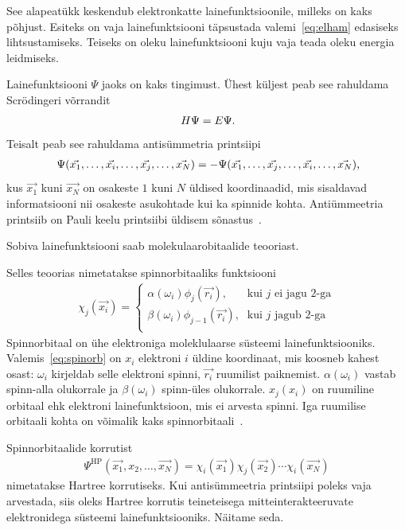 \documentclass[12pt]{report}
\begin{document}
See alapeatükk keskendub elektronkatte lainefunktsioonile, milleks on kaks põhjust.
Esiteks on vaja lainefunktsiooni täpsustada valemi~\eqref{eq:elham} edasiseks lihtsustamiseks.
Teiseks on oleku lainefunktsiooni kuju vaja teada oleku energia leidmiseks.

Lainefunktsiooni \(\Psi\) jaoks on kaks tingimust.
Ühest küljest peab see rahuldama Scrödingeri võrrandit
\begin{align}
    H \Psi = E \Psi \rlap{.}
\end{align}
Teisalt peab see rahuldama antisümmetria printsiipi
\begin{align}
    \Psi(\vec{x_1}, \ldots, \vec{x_i}, \ldots, \vec{x_j}, \ldots, \vec{x_N})
    = -\Psi(\vec{x_1}, \ldots, \vec{x_j}, \ldots, \vec{x_i}, \ldots, \vec{x_N}) \rlap{,}
\end{align}
kus \(\vec{x_1}\) kuni \(\vec{x_N}\) on osakeste \(1\) kuni \(N\) üldised koordinaadid, mis sisaldavad informatsiooni nii osakeste asukohtade kui ka spinnide kohta.
Antiümmeetria printsiib on Pauli keelu printsiibi üldisem sõnastus~\cite{szabo+ostlund}.

Sobiva lainefunktsiooni saab molekulaarobitaalide teooriast.

Selles teoorias nimetatakse spinnorbitaaliks funktsiooni
\begin{align}\label{eq:spinorb}
    \chi_j(\vec{x_i}) = \begin{cases}
        \alpha(\omega_i) \phi_j(\vec{r_i})\text{,} & \text{kui \(j\) ei jagu \(2\)-ga} \\
        \beta(\omega_i) \phi_{j-1}(\vec{r_i})\text{,} & \text{kui \(j\) jagub \(2\)-ga} \\
    \end{cases}
\end{align}
Spinnorbitaal on ühe elektroniga moleklulaarse süsteemi lainefunktsiooniks.
Valemis~\eqref{eq:spinorb} on \(x_i\) elektroni \(i\) üldine koordinaat, mis koosneb kahest osast: \(\omega_i\) kirjeldab selle elektroni spinni, \(\vec{r_i}\) ruumilist paiknemist.
\(\alpha(\omega_i)\) vastab spinn-alla olukorrale ja \(\beta(\omega_i)\) spinn-üles olukorrale.
\(x_j(x_i)\) on ruumiline orbitaal ehk elektroni lainefunktsioon, mis ei arvesta spinni.
Iga ruumilise orbitaali kohta on võimalik kaks spinnorbitaali~\cite{szabo+ostlund}.

Spinnorbitaalide korrutist
\begin{align}\label{eq:hp}
    \Psi^\text{HP}(\vec{x_1}, x_2, \ldots, \vec{x_N})
    = \chi_i(\vec{x_1}) \chi_j(\vec{x_2}) \cdots \chi_i(\vec{x_N})
\end{align}
nimetatakse Hartree korrutiseks.
Kui antisümmeetria printsiipi poleks vaja arvestada, siis oleks Hartree korrutis teineteisega mitteinterakteeruvate elektronidega süsteemi lainefunktsiooniks.
Näitame seda.
\end{document}
